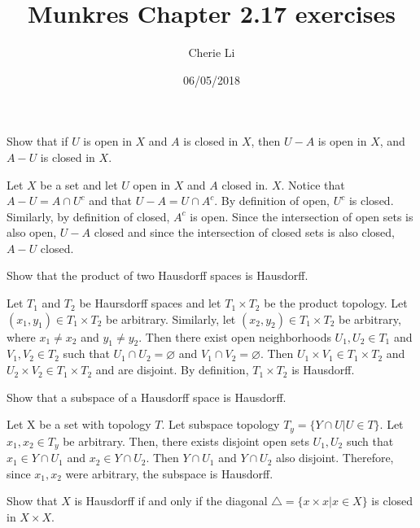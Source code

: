 \documentclass[12pt]{article}
\title{Munkres Chapter 2.17 exercises}
\author{Cherie Li}
\date{06/05/2018}
\newenvironment{problem}[2][Problem]
{
	\begin{trivlist} 
		\item[\hskip \labelsep {\bfseries #1 #2:}]
	}
{
	\end{trivlist}
	}
\newenvironment{solution}[1][Solution]
{
	\begin{trivlist} 
		\item[\hskip \labelsep {\itshape #1:}]
	}
	{
	\end{trivlist}
}
\begin{document}
\maketitle
\newpage
\begin{problem}[Exercise]{2.17.4}
Show that if $U$ is open in $X$ and $A$ is closed in $X$, then $U-A$ is open in $X$, and $A-U$ is closed in $X$. 
\end{problem}
\begin{solution}
Let $X$ be a set and let $U$ open in $X$ and $A$ closed in. $X$. Notice that $A-U = A \cap U^c$ and that $U-A = U \cap A^c$. By definition of open, $U^c$ is closed. Similarly, by definition of closed, $A^c$ is open. Since the intersection of open sets is also open, $U - A$ closed and since the intersection of closed sets is also closed, $A-U$ closed. 
\end{solution}
\begin{problem}[Exercise]{2.17.11}
Show that the product of two Hausdorff spaces is Hausdorff.
\end{problem}
\begin{solution}
Let $T_1$ and $T_2$ be Haursdorff spaces and let $T_1 \times T_2$ be the product topology. Let $(x_1,y_1) \in T_1 \times T_2$ be arbitrary. Similarly, let 
$(x_2, y_2) \in T_1 \times T_2$ be arbitrary, where $x_1 \neq x_2$ and 
$y_1 \neq y_2$. Then there exist open neighborhoods $U_1, U_2 \in T_1$ and $V_1, V_2 \in T_2$ such that $U_1 \cap U_2 = \varnothing$ 
and $V_1 \cap V_2 = \varnothing$. Then $U_1 \times V_1 \in T_1 \times T_2$ and $U_2 \times V_2 \in T_1 \times T_2$ and are disjoint. By definition, $T_1 \times T_2$ is Hausdorff. 
\end{solution}
\begin{problem}[Exercise]{2.17.12}
Show that a subspace of a Hausdorff space is Hausdorff. 
\end{problem}
\begin{solution}
Let X be a set with topology $T$. Let subspace topology $T_y = \lbrace{Y \cap U| U \in T \rbrace}$. Let $x_1, x_2 \in T_y$ be arbitrary. Then, there exists disjoint open sets $U_1, U_2$ such that $x_1 \in Y \cap U_1$ and $x_2 \in Y \cap U_2$. Then $Y \cap U_1$ and $Y \cap U_2$ also disjoint. Therefore, since $x_1, x_2$ were arbitrary, the subspace is Hausdorff. 
\end{solution}
\begin{problem}[Exercise]{2.17.13}
Show that $X$ is Hausdorff if and only if the diagonal $\triangle = \lbrace{x \times x | x \in X \rbrace}$ is closed in $X \times X$. 
\end{problem}
\end{document}
